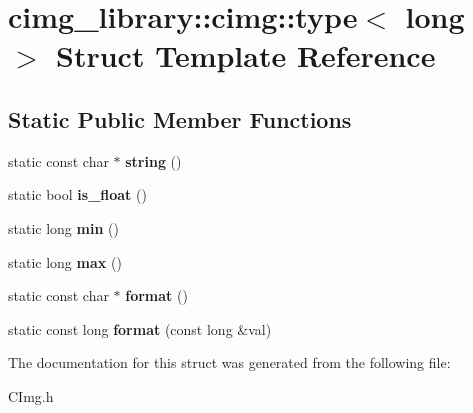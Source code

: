 \hypertarget{structcimg__library_1_1cimg_1_1type_3_01long_01_4}{\section{cimg\-\_\-library\-:\-:cimg\-:\-:type$<$ long $>$ Struct Template Reference}
\label{structcimg__library_1_1cimg_1_1type_3_01long_01_4}
}
\subsection*{Static Public Member Functions}
\begin{DoxyCompactItemize}
\item 
\hypertarget{structcimg__library_1_1cimg_1_1type_3_01long_01_4_a76a2de84637123ef993842e7fa1d90aa}{static const char $\ast$ {\bfseries string} ()}\label{structcimg__library_1_1cimg_1_1type_3_01long_01_4_a76a2de84637123ef993842e7fa1d90aa}

\item 
\hypertarget{structcimg__library_1_1cimg_1_1type_3_01long_01_4_a120569f4bf9429feddcfb0694885fe4f}{static bool {\bfseries is\-\_\-float} ()}\label{structcimg__library_1_1cimg_1_1type_3_01long_01_4_a120569f4bf9429feddcfb0694885fe4f}

\item 
\hypertarget{structcimg__library_1_1cimg_1_1type_3_01long_01_4_afe90ecbbafdc1983746676722b1deb64}{static long {\bfseries min} ()}\label{structcimg__library_1_1cimg_1_1type_3_01long_01_4_afe90ecbbafdc1983746676722b1deb64}

\item 
\hypertarget{structcimg__library_1_1cimg_1_1type_3_01long_01_4_ab11af855b5c2b0d00df54d66e9388748}{static long {\bfseries max} ()}\label{structcimg__library_1_1cimg_1_1type_3_01long_01_4_ab11af855b5c2b0d00df54d66e9388748}

\item 
\hypertarget{structcimg__library_1_1cimg_1_1type_3_01long_01_4_a3d23ae76ffb266efd73b23468bbfbde4}{static const char $\ast$ {\bfseries format} ()}\label{structcimg__library_1_1cimg_1_1type_3_01long_01_4_a3d23ae76ffb266efd73b23468bbfbde4}

\item 
\hypertarget{structcimg__library_1_1cimg_1_1type_3_01long_01_4_aa20701da59d1c04f2be356b9b0e5b87b}{static const long {\bfseries format} (const long \&val)}\label{structcimg__library_1_1cimg_1_1type_3_01long_01_4_aa20701da59d1c04f2be356b9b0e5b87b}

\end{DoxyCompactItemize}


The documentation for this struct was generated from the following file\-:\begin{DoxyCompactItemize}
\item 
C\-Img.\-h\end{DoxyCompactItemize}
